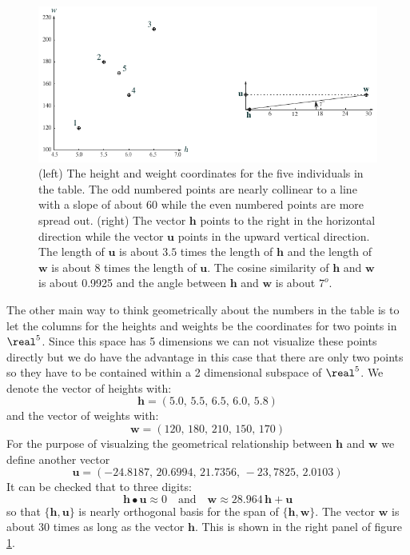 \begin{figure}[h]
\centering
\includegraphics[scale=1.25]{./images/heightWeight.pdf}
\caption{(left) The height and weight coordinates for the five individuals in
the table.  The odd numbered points are nearly collinear to a line with a
slope of about $60$ while the even numbered points are more spread out.
(right)  The vector $\mathbf{h}$ points to the right in the horizontal 
direction while the vector $\mathbf{u}$ points in the upward vertical 
direction.  The length of $\mathbf{u}$ is about $3.5$ times the length of 
$\mathbf{h}$ and the length of $\mathbf{w}$ is about $8$ times the length of
$\mathbf{u}$.  The cosine similarity of $\mathbf{h}$ and $\mathbf{w}$ is about 
0.9925 and the angle between $\mathbf{h}$ and $\mathbf{w}$ is about $7^o$.} 
\label{twogeoms}
\end{figure}

   The other main way to think geometrically about the numbers in the table is 
to let the columns for the heights and weights be the coordinates for two 
points in $\real^5$.  Since this space has 5 dimensions we can not visualize 
these points directly but we do have the advantage in this case that there are 
only two points so they have to be contained within a 2 dimensional subspace
of $\real^5$.  We denote the vector of heights with:
\begin{equation*}
\mathbf{h} = (5.0,\, 5.5,\, 6.5,\, 6.0,\, 5.8)
\end{equation*}
and the vector of weights with:
\begin{equation*}
\mathbf{w} = (120,\, 180,\, 210,\, 150,\, 170)
\end{equation*}
For the purpose of visualzing the geometrical relationship between 
$\mathbf{h}$ and $\mathbf{w}$ we define another vector
\begin{equation*}
\mathbf{u} = (-24.8187,\, 20.6994,\, 21.7356,\, -23,7825,\, 2.0103)
\end{equation*}
It can be checked that to three digits:
\begin{equation*}
\mathbf{h} \bullet \mathbf{u} \approx 0 \quad \mbox{and} \quad
\mathbf{w} \approx 28.964 \, \mathbf{h} + \mathbf{u}
\end{equation*}
so that $\{ \mathbf{h}, \mathbf{u} \}$ is nearly orthogonal basis for the span
of $\{ \mathbf{h}, \mathbf{w} \}$.  The vector $\mathbf{w}$ is about $30$ 
times as long as the vector $\mathbf{h}$.  This is shown in the right panel of
figure \ref{twogeoms}.

